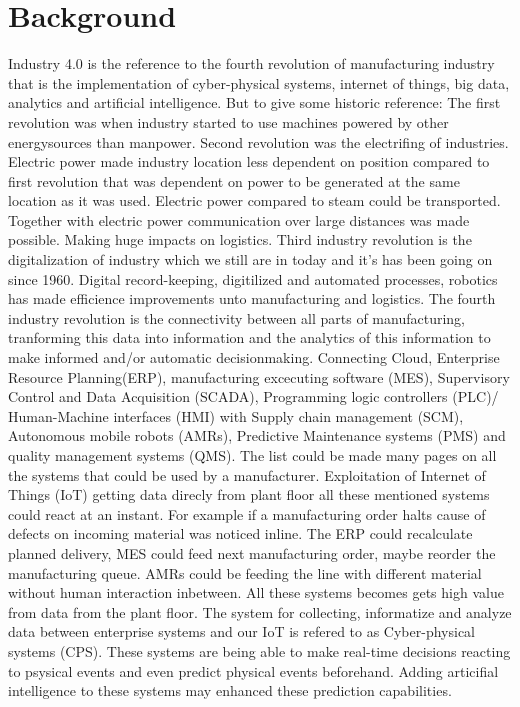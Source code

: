 \documentclass[article,a4paper]{IEEEtran}
\begin{document}
    \section{Background}
    Industry 4.0 is the reference to the fourth revolution of manufacturing industry that is the implementation of cyber-physical systems, internet of things, big data, analytics and artificial intelligence. But to give some historic reference: The first revolution was when industry started to use machines powered by other energysources than manpower. Second revolution was the electrifing of industries. Electric power made industry location less dependent on position compared to first revolution that was dependent on power to be generated at the same location as it was used. Electric power compared to steam could be transported. Together with electric power communication over large distances was made possible. Making huge impacts on logistics. Third industry revolution is the digitalization of industry which we still are in today and it's has been going on since 1960. Digital record-keeping, digitilized and automated processes, robotics has made efficience improvements unto manufacturing and logistics. \newline\newline
    The fourth industry revolution is the connectivity between all parts of manufacturing, tranforming this data into information and the analytics of this information to make informed and/or automatic decisionmaking. Connecting Cloud, Enterprise Resource Planning(ERP), manufacturing excecuting software (MES), Supervisory Control and Data Acquisition (SCADA), Programming logic controllers (PLC)/ Human-Machine interfaces (HMI) \cite{industry4.0} with Supply chain management (SCM), Autonomous mobile robots (AMRs), Predictive Maintenance systems (PMS) and quality management systems (QMS). The list could be made many pages on all the systems that could be used by a manufacturer.
    \newline\newline
    Exploitation of Internet of Things (IoT) getting data direcly from plant floor all these mentioned systems could react at an instant. For example if a manufacturing order halts cause of defects on incoming material was noticed inline. The ERP could recalculate planned delivery, MES could feed next manufacturing order, maybe reorder the manufacturing queue. AMRs could be feeding the line with different material without human interaction inbetween. All these systems becomes gets high value from data from the plant floor. The system for collecting, informatize and analyze data between enterprise systems and our IoT is refered to as Cyber-physical systems (CPS). These systems are being able to make real-time decisions reacting to psysical events and even predict physical events beforehand. Adding articifial intelligence to these systems may enhanced these prediction capabilities.
\end{document}

